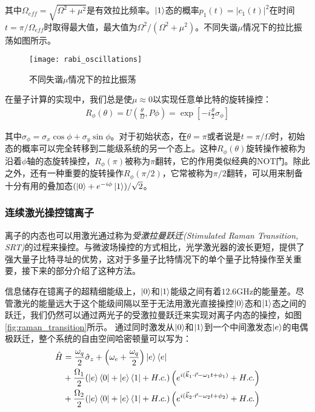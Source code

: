 其中$\Omega_{eff}=\sqrt{\Omega^2+\mu^2}$是有效拉比频率\cite[]{Foot_2005}。$\ket{1}$态的概率$p_1(t)=|c_1(t)|^2$在时间$t=\pi/\Omega_{eff}$时取得最大值，最大值为$\Omega^2/(\Omega^2+\mu^2)$。不同失谐$\mu$情况下的拉比振荡如图所示。

\begin{figure}
    \centering
    \caption[不同失谐$\mu$情况下的拉比振荡]{不同失谐$\mu$情况下的拉比振荡\cite[]{Lu_2019}}
    \texttt{[image: rabi\_oscillations]}
\end{figure}

在量子计算的实现中，我们总是使$\mu\approx0$以实现任意单比特的旋转操控：
\begin{align}
    R_\phi(\theta)=U\left(\frac{\theta}{\Omega},P\phi\right)=\exp[-i\frac{\theta}{2}\sigma_\phi]
\end{align}

其中$\sigma_\phi=\sigma_x\cos{\phi}+\sigma_y\sin{\phi}$。对于初始状态，在$\theta=\pi$或者说是$t=\pi/\Omega$时，初始态的概率可以完全转移到二能级系统的另一个态上。这种$R_\phi(\theta)$旋转操作被称为沿着$\phi$轴的态旋转操控，$R_\phi(\pi)$被称为$\pi$翻转，它的作用类似经典的NOT门。除此之外，还有一种重要的旋转操作$R_\phi(\pi/2)$，它常被称为$\pi/2$翻转，可以用来制备十分有用的叠加态$(\ket{0}+e^{-i\phi}\ket{1})/\sqrt{2}$。



\subsubsection[连续激光操控镱离子]{连续激光操控镱离子\label{section:raman_transition}}

离子的内态也可以用激光通过称为\emph{受激拉曼跃迁(Stimulated Raman Transition, SRT)}的过程来操控。与微波场操控的方式相比，光学激光器的波长更短，提供了强大量子比特寻址的优势，这对于多量子比特情况下的单个量子比特操作至关重要，接下来的部分介绍了这种方法。


信息储存在镱离子的超精细能级上，$\ket{0}$和$\ket{1}$能级之间有着$12.6$GHz的能量差。尽管激光的能量远大于这个能级间隔以至于无法用激光直接操控$\ket{0}$态和$\ket{1}$态之间的跃迁，我们仍然可以通过两光子的受激拉曼跃迁来实现对离子内态的操控，如图\ref{fig:raman_transition}所示。
通过同时激发从$\ket{0}$和$\ket{1}$到一个中间激发态$\ket{e}$的电偶极跃迁，整个系统的自由空间哈密顿量可以写为：
\begin{align}
    \hat{H}&=\frac{\omega_q}{2}\hat{\sigma}_z+\left(\omega_e+\frac{\omega_q}{2}\right)\ket{e}\bra{e}\\
    &+\frac{\Omega_1}{2}(\ket{e}\bra{0}+\ket{e}\bra{1}+H.c.)\left(e^{i(\vec{k}_1\cdot\vec{r}-\omega_1t+\phi_1)}+H.c.\right)\\
    &+\frac{\Omega_2}{2}(\ket{e}\bra{0}+\ket{e}\bra{1}+H.c.)\left(e^{i(\vec{k}_2\cdot\vec{r}-\omega_2t+\phi_2)}+H.c.\right)
\end{align}

